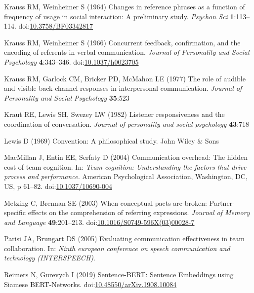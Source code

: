 \documentclass[
  english,
  a4paper,
]{article}
\newlength{\cslhangindent}
\newlength{\cslentryspacingunit} %
\newenvironment{CSLReferences}[2] %
 {%
  \setlength{\parindent}{0pt}
  \ifodd #1
  \let\oldpar\par
  \def\par{\hangindent=\cslhangindent\oldpar}
  \fi
  \setlength{\parskip}{#2\cslentryspacingunit}
 }%
 {}
\begin{document}
\begin{CSLReferences}{1}{0}
\leavevmode{}%
Krauss RM, Weinheimer S (1964) Changes in reference phrases as a function of frequency of usage in social interaction: A preliminary study. \emph{Psychon Sci} \textbf{1}:113--114. doi:\href{https://doi.org/10.3758/BF03342817}{10.3758/BF03342817}

\leavevmode{}%
Krauss RM, Weinheimer S (1966) Concurrent feedback, confirmation, and the encoding of referents in verbal communication. \emph{Journal of Personality and Social Psychology} \textbf{4}:343--346. doi:\href{https://doi.org/10.1037/h0023705}{10.1037/h0023705}

\leavevmode{}%
Krauss RM, Garlock CM, Bricker PD, McMahon LE (1977) The role of audible and visible back-channel responses in interpersonal communication. \emph{Journal of Personality and Social Psychology} \textbf{35}:523

\leavevmode{}%
Kraut RE, Lewis SH, Swezey LW (1982) Listener responsiveness and the coordination of conversation. \emph{Journal of personality and social psychology} \textbf{43}:718

\leavevmode{}%
Lewis D (1969) Convention: A philosophical study. John Wiley \& Sons

\leavevmode{}%
MacMillan J, Entin EE, Serfaty D (2004) Communication overhead: {The} hidden cost of team cognition. In: \emph{Team cognition: {Understanding} the factors that drive process and performance.} American Psychological Association, Washington, DC, US, p 61--82. doi:\href{https://doi.org/10.1037/10690-004}{10.1037/10690-004}

\leavevmode{}%
Metzing C, Brennan SE (2003) When conceptual pacts are broken: {Partner-specific} effects on the comprehension of referring expressions. \emph{Journal of Memory and Language} \textbf{49}:201--213. doi:\href{https://doi.org/10.1016/S0749-596X(03)00028-7}{10.1016/S0749-596X(03)00028-7}

\leavevmode{}%
Parisi JA, Brungart DS (2005) Evaluating communication effectiveness in team collaboration. In: \emph{Ninth european conference on speech communication and technology (INTERSPEECH)}.

\leavevmode{}%
Reimers N, Gurevych I (2019) Sentence-{BERT}: {Sentence Embeddings} using {Siamese BERT-Networks}. doi:\href{https://doi.org/10.48550/arXiv.1908.10084}{10.48550/arXiv.1908.10084}


\end{CSLReferences}
\end{document}
